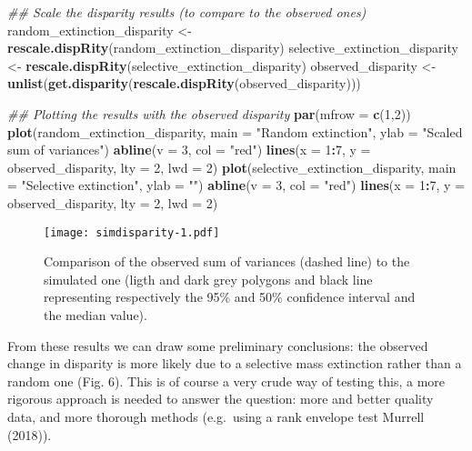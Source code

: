 \documentclass[
]{article}
\newenvironment{Shaded}{\begin{snugshade}}{\end{snugshade}}
\newcommand{\CommentTok}[1]{\textcolor[rgb]{0.56,0.35,0.01}{\textit{#1}}}
\newcommand{\DataTypeTok}[1]{\textcolor[rgb]{0.13,0.29,0.53}{#1}}
\newcommand{\DecValTok}[1]{\textcolor[rgb]{0.00,0.00,0.81}{#1}}
\newcommand{\KeywordTok}[1]{\textcolor[rgb]{0.13,0.29,0.53}{\textbf{#1}}}
\newcommand{\NormalTok}[1]{#1}
\newcommand{\OperatorTok}[1]{\textcolor[rgb]{0.81,0.36,0.00}{\textbf{#1}}}
\newcommand{\StringTok}[1]{\textcolor[rgb]{0.31,0.60,0.02}{#1}}
\begin{document}
\begin{Shaded}
\begin{Highlighting}[]
\CommentTok{\#\# Scale the disparity results (to compare to the observed ones)}
\NormalTok{random\_extinction\_disparity \textless{}{-}}\StringTok{ }\KeywordTok{rescale.dispRity}\NormalTok{(random\_extinction\_disparity)}
\NormalTok{selective\_extinction\_disparity \textless{}{-}}\StringTok{ }\KeywordTok{rescale.dispRity}\NormalTok{(selective\_extinction\_disparity)}
\NormalTok{observed\_disparity \textless{}{-}}\StringTok{ }\KeywordTok{unlist}\NormalTok{(}\KeywordTok{get.disparity}\NormalTok{(}\KeywordTok{rescale.dispRity}\NormalTok{(observed\_disparity)))}

\CommentTok{\#\# Plotting the results with the observed disparity}
\KeywordTok{par}\NormalTok{(}\DataTypeTok{mfrow =} \KeywordTok{c}\NormalTok{(}\DecValTok{1}\NormalTok{,}\DecValTok{2}\NormalTok{))}
\KeywordTok{plot}\NormalTok{(random\_extinction\_disparity, }\DataTypeTok{main =} \StringTok{"Random extinction"}\NormalTok{, }\DataTypeTok{ylab =} \StringTok{"Scaled sum of variances"}\NormalTok{)}
\KeywordTok{abline}\NormalTok{(}\DataTypeTok{v =} \DecValTok{3}\NormalTok{, }\DataTypeTok{col =} \StringTok{"red"}\NormalTok{)}
\KeywordTok{lines}\NormalTok{(}\DataTypeTok{x =} \DecValTok{1}\OperatorTok{:}\DecValTok{7}\NormalTok{, }\DataTypeTok{y =}\NormalTok{ observed\_disparity, }\DataTypeTok{lty =} \DecValTok{2}\NormalTok{, }\DataTypeTok{lwd =} \DecValTok{2}\NormalTok{)}
\KeywordTok{plot}\NormalTok{(selective\_extinction\_disparity, }\DataTypeTok{main =} \StringTok{"Selective extinction"}\NormalTok{, }\DataTypeTok{ylab =} \StringTok{""}\NormalTok{)}
\KeywordTok{abline}\NormalTok{(}\DataTypeTok{v =} \DecValTok{3}\NormalTok{, }\DataTypeTok{col =} \StringTok{"red"}\NormalTok{)}
\KeywordTok{lines}\NormalTok{(}\DataTypeTok{x =} \DecValTok{1}\OperatorTok{:}\DecValTok{7}\NormalTok{, }\DataTypeTok{y =}\NormalTok{ observed\_disparity, }\DataTypeTok{lty =} \DecValTok{2}\NormalTok{, }\DataTypeTok{lwd =} \DecValTok{2}\NormalTok{)}
\end{Highlighting}
\end{Shaded}

\begin{figure}
\centering
\texttt{[image: simdisparity-1.pdf]}
\caption{Comparison of the observed sum of variances (dashed line) to
the simulated one (ligth and dark grey polygons and black line
representing respectively the 95\% and 50\% confidence interval and the
median value).}
\end{figure}

From these results we can draw some preliminary conclusions: the
observed change in disparity is more likely due to a selective mass
extinction rather than a random one (Fig. 6). This is of course a very
crude way of testing this, a more rigorous approach is needed to answer
the question: more and better quality data, and more thorough methods
(e.g.~using a rank envelope test Murrell (2018)).
\end{document}
